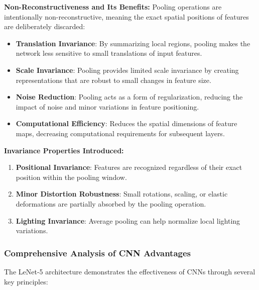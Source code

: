 \documentclass[a4paper, journal]{IEEEtran}
\begin{document}
\textbf{Non-Reconstructiveness and Its Benefits:}
Pooling operations are intentionally non-reconstructive, meaning the exact spatial positions of features are deliberately discarded:

\begin{itemize}
    \item \textbf{Translation Invariance}: By summarizing local regions, pooling makes the network less sensitive to small translations of input features.

    \item \textbf{Scale Invariance}: Pooling provides limited scale invariance by creating representations that are robust to small changes in feature size.

    \item \textbf{Noise Reduction}: Pooling acts as a form of regularization, reducing the impact of noise and minor variations in feature positioning.

    \item \textbf{Computational Efficiency}: Reduces the spatial dimensions of feature maps, decreasing computational requirements for subsequent layers.
\end{itemize}

\textbf{Invariance Properties Introduced:}
\begin{enumerate}
    \item \textbf{Positional Invariance}: Features are recognized regardless of their exact position within the pooling window.
    \item \textbf{Minor Distortion Robustness}: Small rotations, scaling, or elastic deformations are partially absorbed by the pooling operation.
    \item \textbf{Lighting Invariance}: Average pooling can help normalize local lighting variations.
\end{enumerate}

\subsubsection{Comprehensive Analysis of CNN Advantages}

The LeNet-5 architecture demonstrates the effectiveness of CNNs through several key principles:
\end{document}

